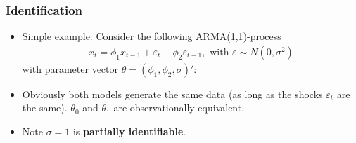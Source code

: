 \documentclass[handout]{beamer}  %
\begin{document}
\begin{frame}\frametitle{Identification}
	\begin{itemize}[<+->]
		\item Simple example: Consider the following ARMA(1,1)-process
		\begin{align*}
			x_t = \phi_1 x_{t-1} + \varepsilon_t -\phi_2 \varepsilon_{t-1}, \text{ with } \varepsilon \sim N(0,\sigma^2)
		\end{align*}
		with parameter vector $\theta=(\phi_1,\phi_2,\sigma)'$:\pause
		\begin{figure}[htbp]
		\end{figure}
		\item Obviously both models generate the same data (as long as the shocks $\varepsilon_t$ are the same). $\theta_0$ and $\theta_1$ are observationally equivalent.
		\item Note $\sigma=1$ is \textbf{partially identifiable}.
	\end{itemize}
\end{frame}
\end{document}
